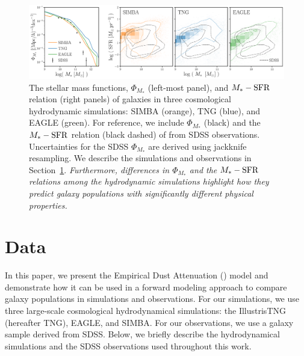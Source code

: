 \begin{figure}
\begin{center}
    \includegraphics[width=\textwidth]{figs/smf_m_sfr.pdf}
    \caption{\label{fig:smf_msfr}
    The stellar mass functions, $\Phi_{M_*}$ (left-most panel), and $M_*-{\rm SFR}$
    relation (right panels) of galaxies in three cosmological hydrodynamic 
    simulations: SIMBA (orange), TNG (blue), and EAGLE (green). 
    For reference, we include $\Phi_{M_*}$ (black) and the $M_*-{\rm SFR}$ relation 
    (black dashed) of from SDSS observations. Uncertainties for the 
    SDSS $\Phi_{M_*}$ are derived using jackknife resampling. We describe the
    simulations and observations in Section~\ref{sec:sims}. 
    \emph{Furthermore, differences
    in $\Phi_{M_*}$ and the $M_*-{\rm SFR}$ relations among the hydrodynamic simulations 
    highlight how they predict galaxy populations with significantly different
    physical properties.} 
    }
\end{center}
\end{figure}

\section{Data}\label{sec:sims}
In this paper, we present the Empirical Dust Attenuation (\eda) model and
demonstrate how it can be used in a forward modeling approach to compare galaxy
populations in simulations and observations. For our simulations, we use three large-scale
cosmological hydrodynamical simulations: the IllustrisTNG (hereafter TNG),
EAGLE, and SIMBA. For our observations, we use a galaxy sample derived from
SDSS. Below, we briefly describe the hydrodynamical simulations and the SDSS
observations used throughout this work.

